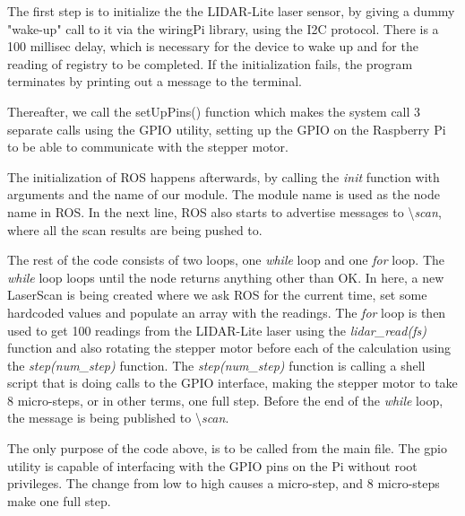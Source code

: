 The first step is to initialize the the LIDAR-Lite laser sensor, by giving a dummy "wake-up" call to it via the wiringPi library, using the I2C protocol. There is a 100 millisec delay, which is necessary for the device to wake up and for the reading of registry to be completed. If the initialization fails, the program terminates by printing out a message to the terminal.

Thereafter, we call the setUpPins() function which makes the system call 3 separate calls using the GPIO utility, setting up the GPIO on the Raspberry Pi to be able to communicate with the stepper motor.

The initialization of ROS happens afterwards, by calling the \textit{init} function with arguments and the name of our module. The module name is used as the node name in ROS. In the next line, ROS also starts to advertise messages to \textbackslash\textit{scan}, where all the scan results are being pushed to.

The rest of the code consists of two loops, one \textit{while} loop and one \textit{for} loop. The \textit{while} loop loops until the node returns anything other than OK. In here, a new LaserScan is being created where we ask ROS for the current time, set some hardcoded values and populate an array with the readings. The \textit{for} loop is then used to get 100 readings from the LIDAR-Lite laser using the \textit{lidar\_read(fs)} function and also rotating the stepper motor before each of the calculation using the \textit{step(num\_step)} function. The \textit{step(num\_step)} function is calling a shell script that is doing calls to the GPIO interface, making the stepper motor to take 8 micro-steps, or in other terms, one full step. Before the end of the \textit{while} loop, the message is being published to \textbackslash\textit{scan}.



The only purpose of the code above, is to be called from the main file. The gpio utility is capable of interfacing with the GPIO pins on the Pi without root privileges. The change from low to high causes a micro-step, and 8 micro-steps make one full step.
